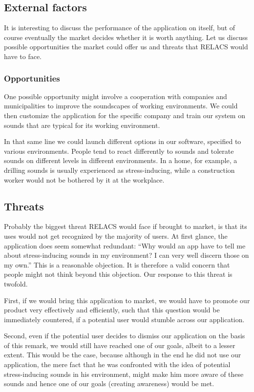 \documentclass[a4paper]{article}
\begin{document}
\subsection{External factors}
It is interesting to discuss the performance of the application on itself, but of course eventually the market decides whether it is worth anything. Let us discuss possible opportunities the market could offer us and threats that RELACS would have to face.

\subsubsection{Opportunities}
One possible opportunity might involve a cooperation with companies and municipalities to improve the soundscapes of working environments. We could then customize the application for the specific company and train our system on sounds that are typical for its working environment.

In that same line we could launch different options in our software, specified to various environments. People tend to react differently to sounds and tolerate sounds on different levels in different environments. In a home, for example, a drilling sounds is usually experienced as stress-inducing, while a construction worker would not be bothered by it at the workplace. 

\subsection{Threats}
Probably the biggest threat RELACS would face if brought to market, is that its uses would not get recognized by the majority of users. At first glance, the application does seem somewhat redundant: ``Why would an app have to tell me about stress-inducing sounds in my environment? I can very well discern those on my own.'' This is a reasonable objection. It is therefore a valid concern that people might not think beyond this objection. Our response to this threat is twofold.

First, if we would bring this application to market, we would have to promote our product very effectively and efficiently, such that this question would be immediately countered, if a potential user would stumble across our application. 

Second, even if the potential user decides to dismiss our application on the basis of this remark, we would still have reached one of our goals, albeit to a lesser extent. This would be the case, because although in the end he did not use our application, the mere fact that he was confronted with the idea of potential stress-inducing sounds in his environment, might make him more aware of these sounds and hence one of our goals (creating awareness) would be met.
\end{document}
